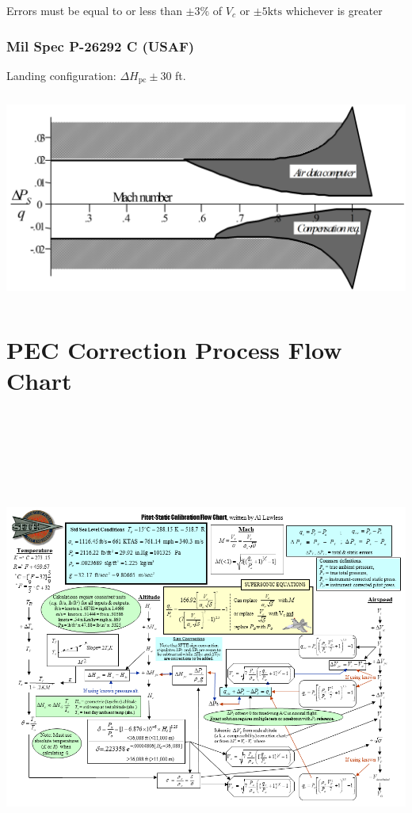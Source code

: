 \documentclass[
]{book}
\begin{document}
Errors must be equal to or less than \(\pm3\%\) of \(V_c\) or \(\pm5\text{kts}\) whichever is greater

\hypertarget{mil-spec-p-26292-c-usaf}{%
\subsubsection*{Mil Spec P-26292 C (USAF)}\label{mil-spec-p-26292-c-usaf}}

Landing configuration: \(\Delta H_{\mathrm{pc}} \pm 30\) ft.

\includegraphics[width=5.75in,height=2.6875in]{media/04/image50.png}

\hypertarget{pec-correction-process-flow-chart}{%
\section{PEC Correction Process Flow Chart}\label{pec-correction-process-flow-chart}}

\includegraphics[width=8.63072in,height=6.4465in]{media/04/image52.png}
\end{document}
